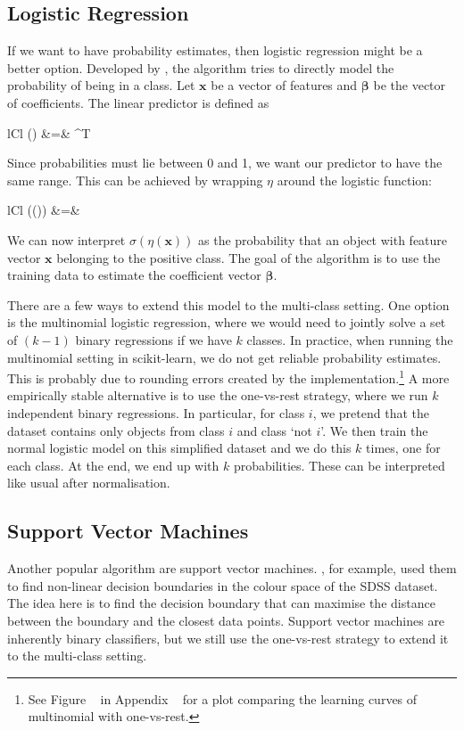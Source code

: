 \subsection{Logistic Regression}
If we want to have probability estimates, then logistic regression might be a better option.
Developed by , the algorithm tries to directly model the probability of 
being in a class. Let $\bm{x}$ be a vector of features and $\bm{\beta}$ be the vector of 
coefficients. The linear predictor is defined as
	\begin{IEEEeqnarray*}{lCl}
		\eta() &=& \bm{\beta}^T 
	\end{IEEEeqnarray*}	
Since probabilities must lie between 0 and 1, we want our predictor to have the same range.
This can be achieved by wrapping $\eta$ around the logistic function:
	\begin{IEEEeqnarray*}{lCl}
		\sigma(\eta()) &=& 
	\end{IEEEeqnarray*}
We can now interpret $\sigma(\eta(\bm{x}))$ as the probability that an object with feature
vector $\bm{x}$ belonging to the positive class. The goal of the algorithm is to use the
training data to estimate the coefficient vector $\bm{\beta}$.

There are a few ways to extend this model to the multi-class setting. One option is
the multinomial logistic regression, where we would need to jointly solve a set of $(k-1)$ 
binary regressions if we have $k$ classes. In practice, when running the multinomial setting
in scikit-learn, we do not get reliable probability estimates. This is probably due
to rounding errors created by the implementation.\footnote{See Figure ~ in
	Appendix ~ for a plot comparing the learning curves of multinomial with one-vs-rest.}
A more empirically stable alternative is to use the one-vs-rest strategy, where we run $k$ 
independent binary regressions. In particular, for class $i$, we pretend that the dataset
contains only objects from class $i$ and class `not $i$'. We then train the normal logistic model
on this simplified dataset and we do this $k$ times, one for each class. At the end, we end up
with $k$ probabilities. These can be interpreted like usual after normalisation.


\subsection{Support Vector Machines}

Another popular algorithm are support vector machines. , for example, used
them to find non-linear decision boundaries in the colour space of the SDSS dataset. The idea
here is to find the decision boundary that can maximise the distance between the boundary and the
closest data points. Support vector machines are inherently binary classifiers, but
we still use the one-vs-rest strategy to extend it to the multi-class setting.

